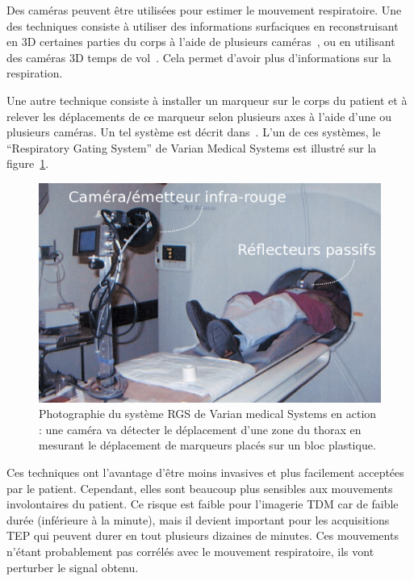 Des caméras peuvent être utilisées pour estimer le mouvement respiratoire. Une des techniques consiste à utiliser des informations surfaciques en reconstruisant en 3D certaines parties du corps à l'aide de plusieurs caméras~\cite{beach2004feasibility}, ou en utilisant des caméras 3D temps de vol~\cite{fayad2009patient}. Cela permet d'avoir plus d'informations sur la respiration.

Une autre technique consiste à installer un marqueur sur le corps du patient et à relever les déplacements de ce marqueur selon plusieurs axes à l'aide d'une ou plusieurs caméras. Un tel système est décrit dans~\cite{nehmeh2002effect}. L'un de ces systèmes, le ``Respiratory Gating System'' de Varian Medical Systems est illustré sur  la figure~\ref{fig:RGSdeVarian}.

\begin{figure}[h!]
	\begin{center}
		\includegraphics[width=12cm]{images/varian}
	\end{center}
	\caption[Photographie du système RGS de Varian medical Systems en action]{Photographie du système RGS de Varian medical Systems en action : une caméra va détecter le déplacement d'une zone du thorax en mesurant le déplacement de marqueurs placés sur un bloc plastique.} 
	\label{fig:RGSdeVarian}
\end{figure}

Ces techniques ont l'avantage d'être moins invasives et plus facilement acceptées par le patient. Cependant, elles sont beaucoup plus sensibles aux mouvements involontaires du patient. Ce risque est faible pour l'imagerie TDM car de faible durée (inférieure à la minute), mais il devient important pour les acquisitions TEP qui peuvent durer en tout plusieurs dizaines de minutes. Ces mouvements n'étant probablement pas corrélés avec le mouvement respiratoire, ils vont perturber le signal obtenu. 

